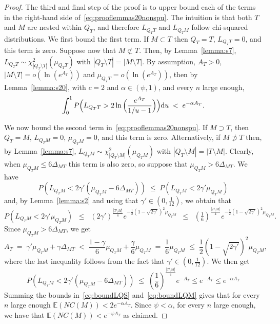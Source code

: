 \documentclass[
  12pt]{article}
\newcommand{\E}{\mathbb{E}}
\begin{document}
\begin{proof}
The third and final step of the proof is to upper bound each of the terms in the right-hand side of~\eqref{eq:prooflemmas20nonspu}. The intuition is that both $T$ and $M$ are nested within $Q_T$, and therefore $L_{Q_T T}$ and $L_{Q_T M}$ follow chi-squared distributions.
We first bound the first term. 
If $M \subset T$ then $Q_T=T$, $L_{Q_TT}=0$, and this term is zero. Suppose now that $M \not\subset T$.  
Then, by Lemma~\ref{lemma:s7}, 
$L_{Q_TT} \sim \mathcal{\chi}_{|Q_T\setminus T|}^2(\mu_{Q_TT})$ with $|Q_T\setminus T|=|M\setminus T|$. By assumption, $A_T>0$, $|M\setminus T|=o(\ln(e^{A_T}))$ and $\mu_{Q_TT}=o(\ln(e^{A_T}))$, then by Lemma~\ref{lemma:s20}, with $c=2$ and $\alpha\in(\psi,1)$, and every $n$ large enough,
\begin{equation}\label{eq:boundLQS}
\int_0^1P\Bigl(L_{Q_TT}>2\ln{\Bigl(\frac{e^{A_T}}{1 / u-1}\Bigl)}\Bigl){\rm d}u \;<\; 
e^{-\alpha A_T}.
\end{equation}

We now bound the second term in~\eqref{eq:prooflemmas20nonspu}. If $M \supset T$, then $Q_T=M$, $L_{Q_TM}=0$, $\mu_{Q_TM}=0$, and this term is zero. Alternatively, if $M \not\supset T$
then, by Lemma~\ref{lemma:s7}, $L_{Q_TM} \sim \chi_{|Q_T\setminus M|}^2(\mu_{Q_TM})$ with $|Q_T\setminus M|=|T\setminus M|$.
Clearly, when $\mu_{Q_TM}\leq 6\Delta_{MT}$ this term is also zero, so suppose that $\mu_{Q_TM}> 6\Delta_{MT}$.  
We have  
$$P\left(L_{Q_TM}<2\gamma'(\mu_{Q_TM}-6\Delta_{MT})\right)\; \leq \; P\left(L_{Q_TM}<2\gamma'\mu_{Q_TM}\right)$$ 
and, by Lemma~\ref{lemma:s2} and using that $\gamma'\in (0,\tfrac{1}{12})$, we obtain that 
$$P\left(L_{Q_TM}<2\gamma'\mu_{Q_TM}\right) \;\;\leq\;\; (2\gamma')^{\frac{|T\setminus M|}{4}} e^{-\frac{1}{2}(1-\sqrt{2\gamma'})^2\mu_{Q_TM}}\;\;\leq\;\;  (\tfrac16)^{\frac{|T\setminus M|}{4}}e^{-\frac{1}{2}(1-\sqrt{2\gamma'})^2\mu_{Q_TM}}.$$
Since $\mu_{Q_TM}>6\Delta_{MT}$, we get
$$
A_T\;=\;\gamma'\mu_{Q_TM}+\gamma\Delta_{MT}\;<\;\frac{1-\gamma}{6}\mu_{Q_TM}+\frac{\gamma}{6}\mu_{Q_TM}\;=\;\frac16\mu_{Q_TM}\;\leq\;\frac12(1-\sqrt{2\gamma'})^2\mu_{Q_TM},
$$
where the last inequality follows from the fact that $\gamma'\in(0, \tfrac{1}{12})$. We then get
\begin{equation}\label{eq:boundLQM}
    P\left(L_{Q_TM}<2\gamma'(\mu_{Q_TM}-6\Delta_{MT})\right) \;\leq\; \left(\frac16\right)^{\frac{|T\setminus M|}{4}}e^{-A_T} \leq e^{-A_T}\leq e^{-\alpha A_T}
\end{equation}
Summing the bounds in~\eqref{eq:boundLQS} and~\eqref{eq:boundLQM} gives that for every $n$ large enough $\E\left(NC(M)\right) < 2e^{-\alpha A_T}$. Since $\psi<\alpha$, for every $n$ large enough, we have that $\E\left(NC(M)\right) < e^{-\psi A_T}$ as claimed.
\end{proof}
\end{document}
